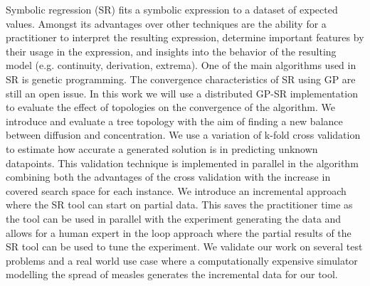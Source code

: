 Symbolic regression (SR) fits a symbolic expression to a dataset of expected values.
Amongst its advantages over other techniques are the ability for a practitioner to interpret the resulting expression, determine important features by their usage in the expression, and insights into the behavior of the resulting model (e.g. continuity, derivation, extrema). One of the main algorithms used in SR is genetic programming. The convergence characteristics of SR using GP are still an open issue.
In this work we will use a distributed GP-SR implementation to evaluate the effect of topologies on the convergence of the algorithm.
We introduce and evaluate a tree topology with the aim of finding a new balance between diffusion and concentration.
We use a variation of k-fold cross validation to estimate how accurate a generated solution is in predicting unknown datapoints. This validation technique is implemented in parallel in the algorithm combining both the advantages of the cross validation with the increase in covered search space for each instance. We introduce an incremental approach where the SR tool can start on partial data. This saves the practitioner time as the tool can be used in parallel with the experiment generating the data and allows for a human expert in the loop approach where the partial results of the SR tool can be used to tune the experiment. We validate our work on several test problems and a real world use case where a computationally expensive simulator modelling the spread of measles generates the incremental data for our tool.